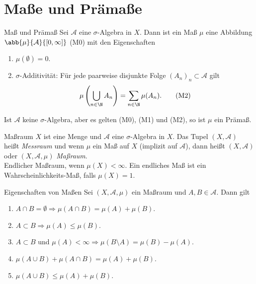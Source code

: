 \section*{Maße und Prämaße}

\begin{karte}{Maß und Prämaß}
	Sei \( \mathcal{A} \) eine \( \sigma \)-Algebra in \(X\). 
	Dann ist ein Maß \(\mu\) eine Abbildung \( \abb{\mu}{\mathcal{A}}{[0,\infty]} \) (M0) 
	mit den Eigenschaften 
	\begin{enumerate}
		\item \(\mu(\emptyset) = 0\). 
		\item \(\sigma\)-Additivität: Für jede paarweise disjunkte Folge \( (A_n)_n \subset \mathcal{A} \) gilt 
		\[ \mu\left( \bigcup_{n\in\N} A_n \right) = \sum_{n\in\N} \mu(A_n). \tag{M2} \]
	\end{enumerate}
	Ist \( \mathcal{A} \) keine \(\sigma\)-Algebra, aber es gelten (M0), (M1) und (M2), so ist \(\mu\) 
	ein Prämaß.
\end{karte}

\begin{karte}{Maßraum}
	\(X\) ist eine Menge und \(\mathcal{A}\) eine \(\sigma\)-Algebra in \(X\). 
	Das Tupel \( (X,\mathcal{A}) \) heißt \textit{Messraum} und wenn \(\mu\) ein 
	Maß auf \(X\) (implizit auf \(\mathcal{A}\)), dann heißt \( (X, \mathcal{A}) \) 
	oder \( (X, \mathcal{A}, \mu) \) \textit{Maßraum}.\\
	Endlicher Maßraum, wenn \( \mu(X) < \infty \). 
	Ein endliches Maß ist ein Wahrscheinlichkeits-Maß, falls \(\mu(X) = 1\).
\end{karte}

\begin{karte}{Eigenschaften von Maßen}
	Sei \( (X, \mathcal{A}, \mu) \) ein Maßraum und \(A,B \in \mathcal{A}\). Dann gilt
	\begin{enumerate}
		\item \(A\cap B = \emptyset \Rightarrow \mu(A\cap B) = \mu(A) + \mu(B)\).
		\item \(A \subset B \Rightarrow \mu(A) \leq \mu(B)\).
		\item \(A \subset B\) und \( \mu(A) < \infty \Rightarrow \mu(B \setminus A) = \mu(B) - \mu(A) \).
		\item \( \mu(A \cup B) + \mu(A\cap B) = \mu(A) + \mu(B) \).
		\item \( \mu(A \cup B) \leq \mu(A) + \mu(B) \).
	\end{enumerate}
\end{karte}

